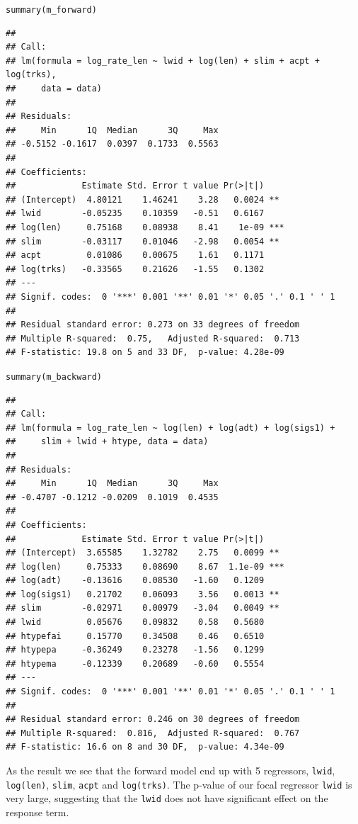 \documentclass[12pt,oneside,a4paper]{article}\usepackage[]{graphicx}\usepackage[]{xcolor}
\makeatletter
\newcommand{\hlstd}[1]{\textcolor[rgb]{0,0,0}{#1}}%
\newcommand{\hlkwd}[1]{\textcolor[rgb]{0,0,0}{#1}}%
\newenvironment{kframe}{%
 \def\at@end@of@kframe{}%
 \ifinner\ifhmode%
  \def\at@end@of@kframe{\end{minipage}}%
  \begin{minipage}{\columnwidth}%
 \fi\fi%
 \def\FrameCommand##1{\hskip\@totalleftmargin \hskip-\fboxsep
 \colorbox{shadecolor}{##1}\hskip-\fboxsep
     \hskip-\linewidth \hskip-\@totalleftmargin \hskip\columnwidth}%
 \MakeFramed {\advance\hsize-\width
   \@totalleftmargin\z@ \linewidth\hsize
   \@setminipage}}%
 {\par\unskip\endMakeFramed%
 \at@end@of@kframe}
\newenvironment{knitrout}{}{} %
\newcommand{\m}[1]{\texttt{{#1}}}
\makeatother
\begin{document}
\begin{knitrout}
\begin{kframe}
\begin{alltt}
\hlkwd{summary}\hlstd{(m_forward)}
\end{alltt}
\begin{verbatim}
## 
## Call:
## lm(formula = log_rate_len ~ lwid + log(len) + slim + acpt + log(trks), 
##     data = data)
## 
## Residuals:
##     Min      1Q  Median      3Q     Max 
## -0.5152 -0.1617  0.0397  0.1733  0.5563 
## 
## Coefficients:
##             Estimate Std. Error t value Pr(>|t|)    
## (Intercept)  4.80121    1.46241    3.28   0.0024 ** 
## lwid        -0.05235    0.10359   -0.51   0.6167    
## log(len)     0.75168    0.08938    8.41    1e-09 ***
## slim        -0.03117    0.01046   -2.98   0.0054 ** 
## acpt         0.01086    0.00675    1.61   0.1171    
## log(trks)   -0.33565    0.21626   -1.55   0.1302    
## ---
## Signif. codes:  0 '***' 0.001 '**' 0.01 '*' 0.05 '.' 0.1 ' ' 1
## 
## Residual standard error: 0.273 on 33 degrees of freedom
## Multiple R-squared:  0.75,	Adjusted R-squared:  0.713 
## F-statistic: 19.8 on 5 and 33 DF,  p-value: 4.28e-09
\end{verbatim}
\begin{alltt}
\hlkwd{summary}\hlstd{(m_backward)}
\end{alltt}
\begin{verbatim}
## 
## Call:
## lm(formula = log_rate_len ~ log(len) + log(adt) + log(sigs1) + 
##     slim + lwid + htype, data = data)
## 
## Residuals:
##     Min      1Q  Median      3Q     Max 
## -0.4707 -0.1212 -0.0209  0.1019  0.4535 
## 
## Coefficients:
##             Estimate Std. Error t value Pr(>|t|)    
## (Intercept)  3.65585    1.32782    2.75   0.0099 ** 
## log(len)     0.75333    0.08690    8.67  1.1e-09 ***
## log(adt)    -0.13616    0.08530   -1.60   0.1209    
## log(sigs1)   0.21702    0.06093    3.56   0.0013 ** 
## slim        -0.02971    0.00979   -3.04   0.0049 ** 
## lwid         0.05676    0.09832    0.58   0.5680    
## htypefai     0.15770    0.34508    0.46   0.6510    
## htypepa     -0.36249    0.23278   -1.56   0.1299    
## htypema     -0.12339    0.20689   -0.60   0.5554    
## ---
## Signif. codes:  0 '***' 0.001 '**' 0.01 '*' 0.05 '.' 0.1 ' ' 1
## 
## Residual standard error: 0.246 on 30 degrees of freedom
## Multiple R-squared:  0.816,	Adjusted R-squared:  0.767 
## F-statistic: 16.6 on 8 and 30 DF,  p-value: 4.34e-09
\end{verbatim}
\end{kframe}
\end{knitrout}

As the result we see that the forward model end up with 5 regressors, \m{lwid}, \m{log(len)}, \m{slim}, \m{acpt} and \m{log(trks)}. The p-value of our focal regressor \m{lwid} is very large, suggesting that the \m{lwid} does not have significant effect on the response term.
\end{document}

